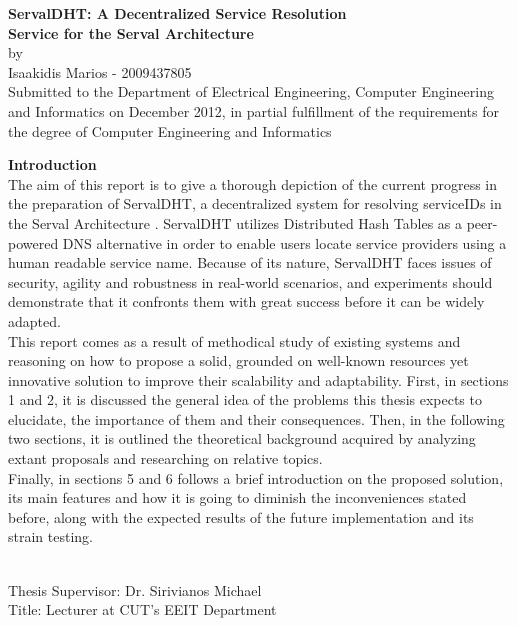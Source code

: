 \documentclass[12pt,a4paper,oneside]{article}
\begin{document}


\begin{center}
{\large {\bf  ServalDHT: A Decentralized Service Resolution\\ Service for the Serval Architecture}\\[0.5cm] by \\[0.5cm] Isaakidis Marios - 2009437805}
 ~\\[0.5cm]
Submitted to the Department of Electrical Engineering, Computer Engineering and Informatics on December 2012, in partial fulfillment of the requirements for the degree of Computer Engineering and Informatics
\end{center}

\vfill

{\Large \bf \noindent Introduction} \\[0.5cm]
The aim of this report is to give a thorough depiction of the current progress in the preparation of ServalDHT, a decentralized system for resolving serviceIDs in the Serval Architecture \cite{Nordstrom2012}. ServalDHT utilizes Distributed Hash Tables as a peer-powered DNS alternative in order to enable users locate service providers using a human readable service name. Because of its nature, ServalDHT faces issues of security, agility and robustness in real-world scenarios, and experiments should demonstrate that it confronts them with great success before it can be widely adapted.\\
\indent This report comes as a result of methodical study of existing systems and reasoning on how to propose a solid, grounded on well-known resources yet innovative solution to improve their scalability and adaptability. First, in sections 1 and 2, it is discussed the general idea of the problems this thesis expects to elucidate, the importance of them and their consequences. Then, in the following two sections, it is outlined the theoretical background acquired by analyzing extant proposals and researching on relative topics.\\
\indent Finally, in sections 5 and 6 follows a brief introduction on the proposed solution, its main features and how it is going to diminish the inconveniences stated before, along with the expected results of the future implementation and its strain testing.

~\\[0.5cm]
{\large
\noindent Thesis Supervisor: Dr. Sirivianos Michael\\
\noindent Title: Lecturer at CUT's EEIT Department}
\end{document}
